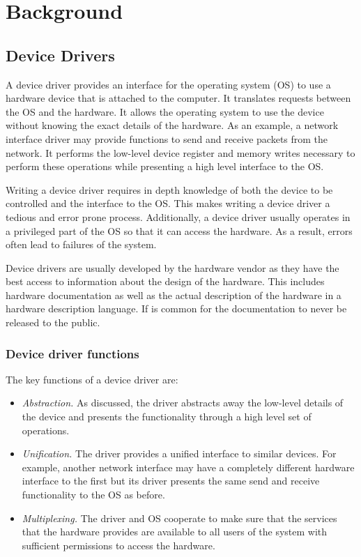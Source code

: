 \chapter{Background}
\label{ch:background}

\section{Device Drivers}

A device driver provides an interface for the operating system (OS) to use a hardware device that is attached to the computer. It translates requests between the OS and the hardware. It allows the operating system to use the device without knowing the exact details of the hardware. As an example, a network interface driver may provide functions to send and receive packets from the network. It performs the low-level device register and memory writes necessary to perform these operations while presenting a high level interface to the OS.

Writing a device driver requires in depth knowledge of both the device to be controlled and the interface to the OS. This makes writing a device driver a tedious and error prone process. Additionally, a device driver usually operates in a privileged part of the OS so that it can access the hardware. As a result, errors often lead to failures of the system.

Device drivers are usually developed by the hardware vendor as they have the best access to information about the design of the hardware. This includes hardware documentation as well as the actual description of the hardware in a hardware description language. If is common for the documentation to never be released to the public.

\subsection{Device driver functions}

The key functions of a device driver are:
\begin{itemize}
    \item \emph{Abstraction.} As discussed, the driver abstracts away the low-level details of the device and presents the functionality through a high level set of operations.
    \item \emph{Unification.} The driver provides a unified interface to similar devices. For example, another network interface may have a completely different hardware interface to the first but its driver presents the same send and receive functionality to the OS as before. 
    \item \emph{Multiplexing.} The driver and OS cooperate to make sure that the services that the hardware provides are available to all users of the system with sufficient permissions to access the hardware.
\end{itemize}

